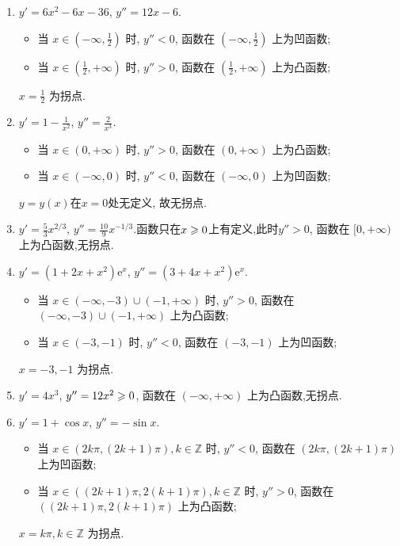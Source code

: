 \begin{solution}
    \begin{enumerate}
        \item $y' = 6x^2 - 6x - 36$, $y'' = 12x - 6$.
              \begin{itemize}
                  \item 当 $x \in (-\infty, \frac{1}{2})$ 时, $y'' < 0$, 函数在 $(-\infty, \frac{1}{2})$ 上为凹函数;
                  \item 当 $x \in (\frac{1}{2}, +\infty)$ 时, $y'' > 0$, 函数在 $(\frac{1}{2}, +\infty)$ 上为凸函数;
              \end{itemize}
              $x = \frac{1}{2}$ 为拐点.
        \item $y' = 1 - \frac{1}{x^2}$, $y'' = \frac{2}{x^3}$.
              \begin{itemize}
                  \item 当 $x \in (0, +\infty)$ 时, $y'' > 0$, 函数在 $(0, +\infty)$ 上为凸函数;
                  \item 当 $x \in (-\infty, 0)$ 时, $y'' < 0$, 函数在 $(-\infty, 0)$ 上为凹函数;
              \end{itemize}
              $y=y(x)$在$x=0$处无定义, 故无拐点.
        \item $y' = \frac{5}{3} x^{2/3}$, $y'' = \frac{10}{9} x^{-1/3}$.函数只在$x\geqslant0$上有定义,此时$y'' > 0$, 函数在 $[0, +\infty)$ 上为凸函数,无拐点.
        \item $y' = (1+2x+x^2)\mathrm{e}^x$, $y'' = (3 + 4x + x^2)\mathrm{e}^x$.
              \begin{itemize}
                  \item 当 $x \in (-\infty, -3) \cup (-1, +\infty)$ 时, $y'' > 0$, 函数在 $(-\infty, -3) \cup (-1, +\infty)$ 上为凸函数;
                  \item 当 $x \in (-3, -1)$ 时, $y'' < 0$, 函数在 $(-3, -1)$ 上为凹函数;
              \end{itemize}
              $x = -3, -1$ 为拐点.
        \item $y' = 4x^3$, $y'' = 12x^2 \geqslant 0$, 函数在 $(-\infty, +\infty)$ 上为凸函数,无拐点.
        \item $y' = 1 + \cos x$, $y'' = -\sin x$.
              \begin{itemize}
                  \item 当 $x \in (2k\pi, (2k+1)\pi), k \in \mathbb{Z}$ 时, $y'' < 0$, 函数在 $(2k\pi, (2k+1)\pi)$ 上为凹函数;
                  \item 当 $x \in ((2k+1)\pi, 2(k+1)\pi), k \in \mathbb{Z}$ 时, $y'' > 0$, 函数在 $((2k+1)\pi, 2(k+1)\pi)$ 上为凸函数;
              \end{itemize}
              $x = k\pi, k \in \mathbb{Z}$ 为拐点.
    \end{enumerate}
\end{solution}

